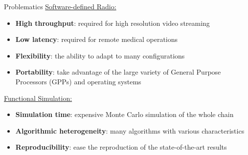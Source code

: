 \begin{frame}{Problematics}
  \vfill
  \underline{Software-defined Radio:}
  \vspace*{.5em}
  \begin{itemize}
    \item<1-> \textbf{High throughput}: required for high resolution video streaming
    \item<2-> \textbf{Low latency}: required for remote medical operations
    \item<3-> \textbf{Flexibility}: the ability to adapt to many configurations
    \item<4-> \textbf{Portability}: take advantage of the large variety of General Purpose Processors (GPPs) and operating systems
  \end{itemize}
  \vfill
  \pause
  \pause
  \pause
  \pause
  \underline{Functional Simulation:}
  \vspace*{.5em}
  \begin{itemize}
    \item<5-> \textbf{Simulation time}: expensive Monte Carlo simulation of the whole chain
    \item<6-> \textbf{Algorithmic heterogeneity}: many algorithms with various characteristics
    \item<7-> \textbf{Reproducibility}: ease the reproduction of the state-of-the-art results
  \end{itemize}
  \vfill
\end{frame}

